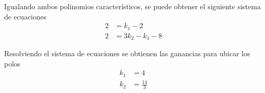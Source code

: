Igualando ambos polinomios característicos, se puede obtener el siguiente sistema de ecuaciones
\[
    \begin{split}
        2 & = k_{1} -2 \\
        2 & = 3k_{2} - k_{1} - 8
    \end{split}
\]

Resolviendo el sistema de ecuaciones se obtienen las ganancias para ubicar los polos
\[
    \begin{split}
        k_{1} & = 4 \\
        k_{2} & = \frac{14}{3}
    \end{split}
\]